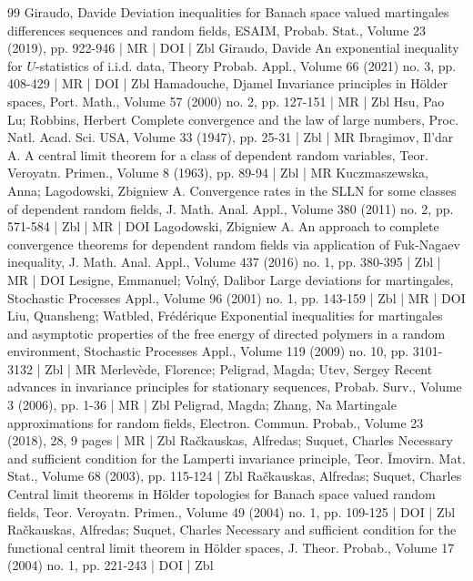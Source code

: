 \documentclass[10pt]{amsart}
\theoremstyle{definition}\newtheorem{defi}[theo]{Definition}\newtheorem{rema}[theo]{Remark}\newtheorem{exam}[theo]{Example}\newtheorem{exem}[theo]{Example}\newtheorem{nota}[theo]{Notation}
\begin{document}
\begin{thebibliography}{99}
 Giraudo, Davide Deviation inequalities for Banach space valued martingales differences sequences and random fields, ESAIM, Probab. Stat., Volume 23 (2019), pp. 922-946 | MR | DOI | Zbl
 Giraudo, Davide An exponential inequality for $U$-statistics of i.i.d. data, Theory Probab. Appl., Volume 66 (2021) no. 3, pp. 408-429 | MR | DOI | Zbl
 Hamadouche, Djamel Invariance principles in Hölder spaces, Port. Math., Volume 57 (2000) no. 2, pp. 127-151 | MR | Zbl
 Hsu, Pao Lu; Robbins, Herbert Complete convergence and the law of large numbers, Proc. Natl. Acad. Sci. USA, Volume 33 (1947), pp. 25-31 | Zbl | MR
 Ibragimov, Il’dar A. A central limit theorem for a class of dependent random variables, Teor. Veroyatn. Primen., Volume 8 (1963), pp. 89-94 | Zbl | MR
 Kuczmaszewska, Anna; Lagodowski, Zbigniew A. Convergence rates in the SLLN for some classes of dependent random fields, J. Math. Anal. Appl., Volume 380 (2011) no. 2, pp. 571-584 | Zbl | MR | DOI
 Lagodowski, Zbigniew A. An approach to complete convergence theorems for dependent random fields via application of Fuk-Nagaev inequality, J. Math. Anal. Appl., Volume 437 (2016) no. 1, pp. 380-395 | Zbl | MR | DOI
 Lesigne, Emmanuel; Volný, Dalibor Large deviations for martingales, Stochastic Processes Appl., Volume 96 (2001) no. 1, pp. 143-159 | Zbl | MR | DOI
 Liu, Quansheng; Watbled, Frédérique Exponential inequalities for martingales and asymptotic properties of the free energy of directed polymers in a random environment, Stochastic Processes Appl., Volume 119 (2009) no. 10, pp. 3101-3132 | Zbl | MR
 Merlevède, Florence; Peligrad, Magda; Utev, Sergey Recent advances in invariance principles for stationary sequences, Probab. Surv., Volume 3 (2006), pp. 1-36 | MR | Zbl
 Peligrad, Magda; Zhang, Na Martingale approximations for random fields, Electron. Commun. Probab., Volume 23 (2018), 28, 9 pages | MR | Zbl
 Račkauskas, Alfredas; Suquet, Charles Necessary and sufficient condition for the Lamperti invariance principle, Teor. Ĭmovirn. Mat. Stat., Volume 68 (2003), pp. 115-124 | Zbl
 Račkauskas, Alfredas; Suquet, Charles Central limit theorems in Hölder topologies for Banach space valued random fields, Teor. Veroyatn. Primen., Volume 49 (2004) no. 1, pp. 109-125 | DOI | Zbl
 Račkauskas, Alfredas; Suquet, Charles Necessary and sufficient condition for the functional central limit theorem in Hölder spaces, J. Theor. Probab., Volume 17 (2004) no. 1, pp. 221-243 | DOI | Zbl

\end{thebibliography}
\end{document}
